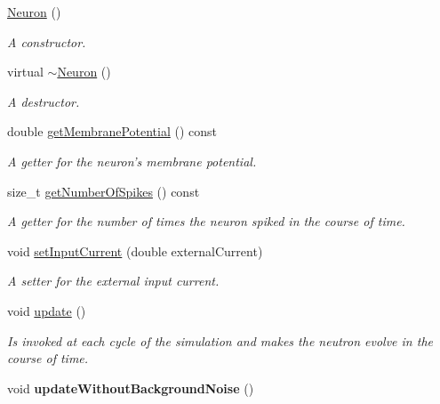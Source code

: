 \begin{DoxyCompactItemize}
\item 
\hypertarget{classNeuron_a823487d01615fadb8ac19a2768dd9d96}{\hyperlink{classNeuron_a823487d01615fadb8ac19a2768dd9d96}{Neuron} ()}\label{classNeuron_a823487d01615fadb8ac19a2768dd9d96}

\begin{DoxyCompactList}\small\item\em A constructor. \end{DoxyCompactList}\item 
\hypertarget{classNeuron_a94a250ce7e167760e593979b899745b1}{virtual \hyperlink{classNeuron_a94a250ce7e167760e593979b899745b1}{$\sim$\-Neuron} ()}\label{classNeuron_a94a250ce7e167760e593979b899745b1}

\begin{DoxyCompactList}\small\item\em A destructor. \end{DoxyCompactList}\item 
double \hyperlink{classNeuron_a86341dee7a81765fe4840777a008c688}{get\-Membrane\-Potential} () const 
\begin{DoxyCompactList}\small\item\em A getter for the neuron's membrane potential. \end{DoxyCompactList}\item 
size\-\_\-t \hyperlink{classNeuron_a9497c01c1513b480cb96488e104c8b00}{get\-Number\-Of\-Spikes} () const 
\begin{DoxyCompactList}\small\item\em A getter for the number of times the neuron spiked in the course of time. \end{DoxyCompactList}\item 
void \hyperlink{classNeuron_ae77210c7b0bf3739b01ec2e3dba96827}{set\-Input\-Current} (double external\-Current)
\begin{DoxyCompactList}\small\item\em A setter for the external input current. \end{DoxyCompactList}\item 
void \hyperlink{classNeuron_a782b3b728eee5097ab205a7a7990225b}{update} ()
\begin{DoxyCompactList}\small\item\em Is invoked at each cycle of the simulation and makes the neutron evolve in the course of time. \end{DoxyCompactList}\item 
\hypertarget{classNeuron_ababbaa5bc5f7b2e00e0ae5ffcc8fbfdb}{void {\bfseries update\-Without\-Background\-Noise} ()}\label{classNeuron_ababbaa5bc5f7b2e00e0ae5ffcc8fbfdb}


\end{DoxyCompactItemize}
